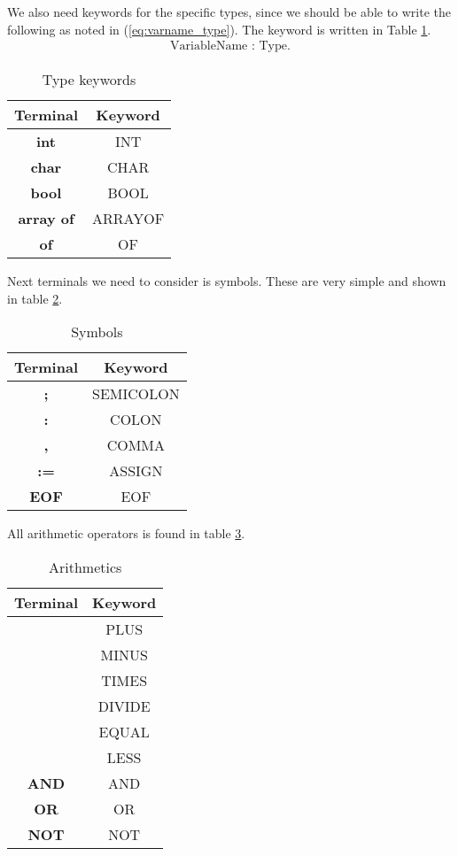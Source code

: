\documentclass[10pt]{article}
\begin{document}
We also need keywords for the specific types, since we should be able to write the following as noted in (\ref{eq:varname_type}). The keyword is written in Table \ref{tab:type_keywords}.
\begin{align}
\label{eq:varname_type}
\text{VariableName} \textbf{ : } \text{Type}.
\end{align}

\begin{table}[h!]
\centering
\begin{tabular}{c|c}
Terminal & Keyword \\
\hline
\textbf{int} & INT \\
\textbf{char} & CHAR \\
\textbf{bool} & BOOL \\
\textbf{array of} & ARRAYOF \\
\textbf{of} & OF \\
\end{tabular}
\caption{\label{tab:type_keywords}Type keywords}
\end{table}

Next terminals we need to consider is symbols. These are very simple and shown in table \ref{tab:symbols}.

\begin{table}[h!]
\centering
\begin{tabular}{c|c}
Terminal & Keyword \\
\hline
\textbf{;} & SEMICOLON \\
\textbf{:} & COLON \\
\textbf{,} & COMMA \\
\textbf{:=} & ASSIGN \\
\textbf{EOF} & EOF \\
\end{tabular}
\caption{\label{tab:symbols}Symbols}
\end{table}

All arithmetic operators is found in table \ref{tab:arithmetics}.

\begin{table}[h!]
\centering
\begin{tabular}{c|c}
Terminal & Keyword \\
\hline
\text{+} & PLUS \\
\text{-} & MINUS \\
\text{*} & TIMES \\
\text{/} & DIVIDE \\
\text{=} & EQUAL \\
\text{<} & LESS \\
\textbf{AND} & AND \\
\textbf{OR} & OR \\
\textbf{NOT} & NOT \\
\end{tabular}
\caption{\label{tab:arithmetics}Arithmetics}
\end{table}
\end{document}
